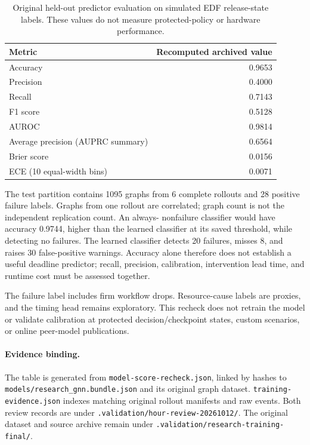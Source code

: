 \documentclass[11pt,a4paper]{article}
\newcommand{\code}[1]{\nolinkurl{#1}}
\begin{document}
\begin{table}[htbp]
\centering\small
\begin{tabular}{lr}
\toprule Metric & Recomputed archived value\\\midrule
Accuracy & 0.9653 \\
Precision & 0.4000 \\
Recall & 0.7143 \\
F1 score & 0.5128 \\
AUROC & 0.9814 \\
Average precision (AUPRC summary) & 0.6564 \\
Brier score & 0.0156 \\
ECE (10 equal-width bins) & 0.0071 \\
\bottomrule
\end{tabular}
\caption{Original held-out predictor evaluation on simulated EDF release-state
labels. These values do not measure protected-policy or hardware performance.}
\end{table}

The test partition contains 1095 graphs from 6 complete
rollouts and 28 positive failure labels. Graphs from one rollout are
correlated; graph count is not the independent replication count. An always-
nonfailure classifier would have accuracy 0.9744, higher than the learned
classifier at its saved threshold, while detecting no failures. The learned
classifier detects 20 failures, misses 8, and raises 30 false-positive warnings.
Accuracy alone therefore does not establish a useful deadline predictor; recall,
precision, calibration, intervention lead time, and runtime cost must be assessed
together.

The failure label includes firm workflow drops. Resource-cause labels are proxies,
and the timing head remains exploratory. This recheck does not retrain the model
or validate calibration at protected decision/checkpoint states, custom scenarios,
or online peer-model publications.

\paragraph{Evidence binding.}
The table is generated from \code{model-score-recheck.json}, linked by hashes
to \code{models/research_gnn.bundle.json} and its original graph dataset.
\code{training-evidence.json} indexes matching original rollout manifests and
raw events. Both review records are under
\code{.validation/hour-review-20261012/}. The original dataset and source archive
remain under \code{.validation/research-training-final/}.
\end{document}
